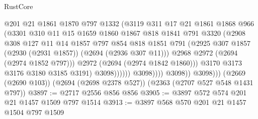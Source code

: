 \begin{lexlean}{RustCore}
\begin{coremodule}
                                  @201
                                  @21
                                  @1861
                                  @1870
                                  @797
                                  @1332
                                  (@3119
                                    @311
                                    @17
                                    @21
                                    @1861
                                    @1868
                                    @966
                                    (@3301
                                      @310
                                      @11
                                      @15
                                      @1659
                                      @1860
                                      @1867
                                      @818
                                      @1841
                                      @791
                                      @3320
                                      (@2908
                                        @308
                                        @127
                                        @11
                                        @14
                                        @1857
                                        @797
                                        @854
                                        @818
                                        @1851
                                        @791
                                        (@2925
                                          @307
                                          @1857
                                          (@2930 (@2931 @1857))
                                          (@2694 (@2936 @307 @11)))
                                        @2968
                                        @2972
                                        (@2694 (@2974 @1852 @797)))
                                      @2972
                                      (@2694 (@2974 @1842 @1860)))
                                    @3170
                                    @3173
                                    @3176
                                    @3180
                                    @3185
                                    @3191)
                                  @3098))))))
                      @3098))))
              @3098))
          @3098)))
    (@2669 (@2690 @103))
    (@2694 (@2698 @2378 @527))
    (@2363 (@2707 @527 @548 @1431 @797))
@3897 := @2717 @2556 @856 @856
@3905 := @3897 @572 @574 @201 @21 @1457 @1509 @797 @1514
@3913 := @3897 @568 @570 @201 @21 @1457 @1504 @797 @1509

\end{coremodule}
\end{lexlean}
